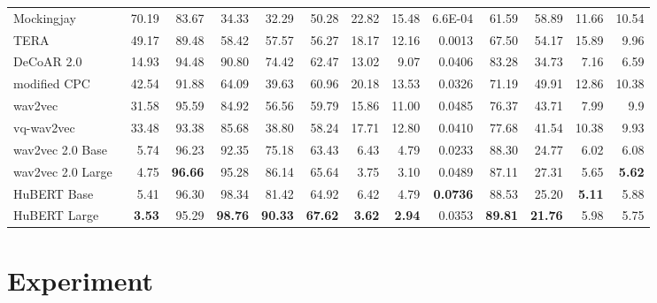 \documentclass[a4paper]{article}
\begin{document}
\begin{table}[ht]
{\begin{tabular}{|l||r|r|r|r|r||rr|r|rr|r|r|}
Mockingjay~\cite{mockingjay} & 70.19 & 83.67 & 34.33 & 32.29 & 50.28 & 22.82 & 15.48 & 6.6E-04 & 61.59 & 58.89 & 11.66 & 10.54 \\

TERA~\cite{tera} & 49.17 & 89.48 & 58.42 & 57.57 & 56.27 & 18.17 & 12.16 & 0.0013 & 67.50 & 54.17 & 15.89 & 9.96 \\

DeCoAR 2.0~\cite{decoar2} & 14.93 & 94.48 & 90.80 & 74.42 & 62.47 & 13.02 & 9.07 & 0.0406 & 83.28 & 34.73 & 7.16 & 6.59 \\

\hline

modified CPC~\cite{modified_cpc} & 42.54 & 91.88 & 64.09 & 39.63 & 60.96 & 20.18 & 13.53 & 0.0326 & 71.19 & 49.91 & 12.86 & 10.38 \\

wav2vec~\cite{wav2vec} & 31.58 & 95.59 & 84.92 & 56.56 & 59.79 & 15.86 & 11.00 & 0.0485 & 76.37 & 43.71 & 7.99 & 9.9 \\

vq-wav2vec~\cite{vq_wav2vec} & 33.48 & 93.38 & 85.68 & 38.80 & 58.24 & 17.71 & 12.80 & 0.0410 & 77.68 & 41.54 & 10.38 & 9.93 \\

wav2vec 2.0 Base~\cite{wav2vec2} & 5.74 & 96.23 & 92.35 & 75.18 & 63.43 & 6.43 & 4.79 & 0.0233 & 88.30 & 24.77 & 6.02 & 6.08 \\

wav2vec 2.0 Large~\cite{wav2vec2} & 4.75 & \textbf{96.66} & 95.28 & 86.14 & 65.64 & 3.75 & 3.10 & 0.0489 & 87.11 & 27.31 & 5.65 &  \textbf{5.62} \\

HuBERT Base~\cite{hsu2021hubert} & 5.41 & 96.30 & 98.34 & 81.42 & 64.92 & 6.42 & 4.79 & \textbf{0.0736} & 88.53 & 25.20 & \textbf{5.11} & 5.88 \\

HuBERT Large~\cite{hsu2021hubert} & \textbf{3.53} & 95.29 & \textbf{98.76} & \textbf{90.33} & \textbf{67.62} & \textbf{3.62} & \textbf{2.94} & 0.0353 & \textbf{89.81} & \textbf{21.76} & 5.98 & 5.75 \\
\hline
\end{tabular}
}
\label{table:exp}
\vspace*{-4mm}
\end{table}

\section{Experiment}
\end{document}

